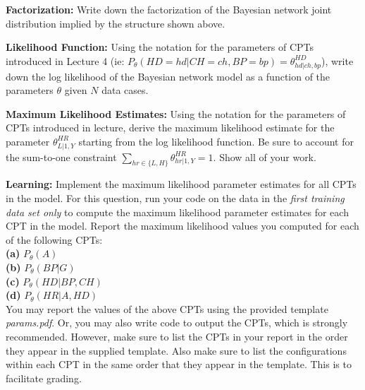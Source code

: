 \documentclass[11pt]{article}
\begin{document}
\begin{problem}{10} \textbf{Factorization:} Write down the factorization of the Bayesian network joint distribution implied by the structure shown above. 

\fbox{\begin{minipage}{42.5em}

\end{minipage}}

\end{problem}


\begin{problem}{10} \textbf{Likelihood Function:} Using the notation for the parameters of CPTs introduced in Lecture 4 (ie: $P_{\theta}(HD=hd|CH=ch,BP=bp)=\theta^{HD}_{hd|ch,bp}$), write down the log likelihood of the Bayesian network model as a function of the parameters $\theta$ given $N$ data cases.
\end{problem}

\begin{problem}{15} \textbf{Maximum Likelihood Estimates:} Using the notation for the parameters of CPTs introduced in lecture, derive the maximum likelihood estimate for the parameter $\theta^{HR}_{L|1,Y}$ starting from the log likelihood function.  Be sure to account for the sum-to-one constraint $\sum\limits_{hr\in\{L,H\}} \theta^{HR}_{hr|1,Y}=1$.  Show all of your work.
\end{problem}

\begin{problem}{15} \textbf{Learning:} Implement the maximum likelihood parameter estimates for all CPTs in the model. For this question, run your code on the data in the \textit{first training data set only} to compute the maximum likelihood parameter estimates for each CPT in the model. Report the maximum likelihood values you computed for each of the following CPTs:\\
	
\textbf{(a)} $P_{\theta}(A)$\\
\textbf{(b)} $P_{\theta}(BP|G)$\\
\textbf{(c)} $P_{\theta}(HD|BP,CH)$\\
\textbf{(d)} $P_{\theta}(HR|A,HD)$\\

You may report the values of the above CPTs using the provided template \textit{params.pdf}. Or, you may also write code to output the CPTs, which is strongly recommended. However, make sure to list the CPTs in your report in the order they appear in the supplied template. Also make sure to list the configurations within each CPT in the same order that they appear in the template. This is to facilitate grading. 
\end{problem}
\end{document}
